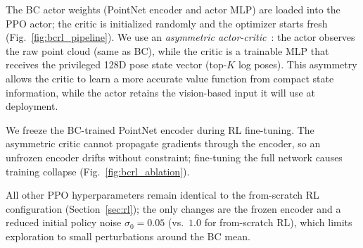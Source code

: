 \documentclass[conference]{IEEEtran}
\begin{document}
The BC actor weights (PointNet encoder and actor MLP) are loaded into the PPO actor; the critic is initialized randomly and the optimizer starts fresh (Fig.~\ref{fig:bcrl_pipeline}).
We use an \emph{asymmetric actor-critic}~\cite{pinto2018asymmetric}: the actor observes the raw point cloud (same as BC), while the critic is a trainable MLP that receives the privileged 128D pose state vector (top-$K$ log poses).
This asymmetry allows the critic to learn a more accurate value function from compact state information, while the actor retains the vision-based input it will use at deployment.

We freeze the BC-trained PointNet encoder during RL fine-tuning.
The asymmetric critic cannot propagate gradients through the encoder, so an unfrozen encoder drifts without constraint; fine-tuning the full network causes training collapse (Fig.~\ref{fig:bcrl_ablation}).

All other PPO hyperparameters remain identical to the from-scratch RL configuration (Section~\ref{sec:rl}); the only changes are the frozen encoder and a reduced initial policy noise $\sigma_0 = 0.05$ (vs.\ $1.0$ for from-scratch RL), which limits exploration to small perturbations around the BC mean.
\end{document}
